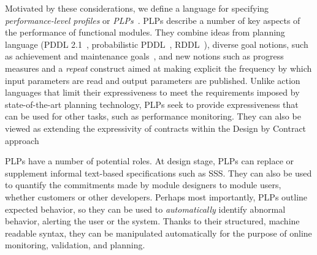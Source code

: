 \documentclass[ 5p, 12pt, times, twocolumn, sort&compress ]{elsarticle}
\begin{document}
Motivated by these considerations, we define a language for specifying {\em performance-level profiles} or {\em PLPs}~\cite{PLP14}. PLPs describe a number of key aspects of the performance of functional modules. They combine 
ideas from planning language (PDDL 2.1~\cite{PDDL2.1}, probabilistic PDDL~\cite{YouLit04}, RDDL~\cite{RDDL}), diverse goal notions, such as achievement and maintenance goals~\cite{PRS, aamas07maint}, and new notions such as progress measures and a {\em repeat\/} construct
aimed at making explicit the frequency by which input parameters are read and output parameters are published. Unlike action languages that limit
their expressiveness to meet the requirements imposed by state-of-the-art planning technology, PLPs seek to provide expressiveness that can be used for other tasks, such as performance monitoring. They can also be viewed as extending the expressivity of contracts within the Design by Contract approach~\cite{Eiffel} 


PLPs have a number of potential roles. At  design stage, PLPs can replace or supplement informal text-based specifications such as SSS.
They can also be used to quantify the commitments made by module designers to module users, whether customers or other developers. Perhaps most importantly, PLPs outline expected behavior, so they can be used to {\em automatically\/} identify abnormal behavior, alerting the user or the system. Thanks to their structured, machine readable syntax, they can be manipulated 
automatically for the purpose of online monitoring, validation, and planning.
\end{document}
